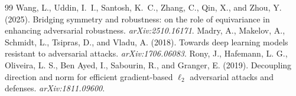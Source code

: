 \documentclass[11pt]{article}
\theoremstyle{plain}
\theoremstyle{definition}
\theoremstyle{remark}
\begin{document}
\begin{thebibliography}{99}
 Wang, L., Uddin, I.\ I., Santosh, K.\ C., Zhang, C., Qin, X., and Zhou, Y. (2025). Bridging symmetry and robustness: on the role of equivariance in enhancing adversarial robustness. \emph{arXiv:2510.16171}.
 Madry, A., Makelov, A., Schmidt, L., Tsipras, D., and Vladu, A. (2018). Towards deep learning models resistant to adversarial attacks. \emph{arXiv:1706.06083}.
 Rony, J., Hafemann, L. G., Oliveira, L. S., Ben Ayed, I., Sabourin, R., and Granger, E. (2019). Decoupling direction and norm for efficient gradient-based $\ell_2$ adversarial attacks and defenses. \emph{arXiv:1811.09600}.
\end{thebibliography}
\end{document}
